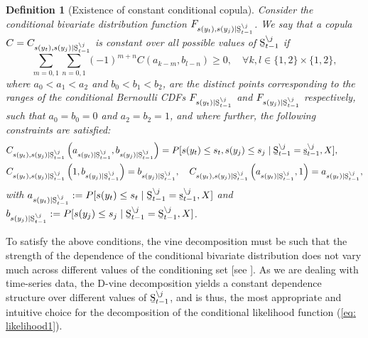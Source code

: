\documentclass[harvard,11pt]{article}
\newtheorem{definition}{Definition}
\begin{document}
\begin{definition}[Existence of constant conditional copula] Consider the conditional bivariate distribution function $F_{s(y_t),s(y_j)\mid \text{\b{S}}_{t-1}^{\backslash j}}$. We say that a copula $C=C_{s(y_t),s(y_j)\mid\text{\b{S}}_{t-1}^{\backslash j}}$ is constant over all possible values of $\text{\b{S}}_{t-1}^{\backslash j}$ if
\[
\sum\limits_{m=0,1}\sum\limits_{n=0,1}(-1)^{m+n}C(a_{k-m},b_{l-n})\geq 0,\quad \forall k,l\in\{1,2\}\times\{1,2\},
\] 
where $a_0<a_1<a_2$ and $b_0<b_1<b_2$, are the distinct points corresponding to the ranges of the conditional Bernoulli CDFs $F_{s(y_t)\mid \text{\b{S}}_{t-1}^{\backslash j}}$ and $F_{s(y_j)\mid \text{\b{S}}_{t-1}^{\backslash j}}$ respectively, such that $a_0=b_0=0$ and $a_{2}=b_{2}=1$, and where further, the following constraints are satisfied:
\begingroup
\allowdisplaybreaks
\begin{align*}
&C_{s(y_t),s(y_j)\mid \text{\b{S}}_{t-1}^{\backslash j}}\left(a_{s(y_t)\mid\text{\b{S}}_{t-1}^{\backslash j}},b_{s(y_j)\mid\text{\b{S}}_{t-1}^{\backslash j}}\right)=P[s(y_t)\leq s_t,s(y_j)\leq s_j\mid \text{\b{S}}_{t-1}^{\backslash j}=\text{\b{s}}_{t-1}^{\backslash j},X],\\
&C_{s(y_t),s(y_j)\mid  \text{\b{S}}_{t-1}^{\backslash j}}\left(1,b_{s(y_j)\mid\text{\b{S}}_{t-1}^{\backslash j}}\right)=b_{s(y_j)\mid\text{\b{S}}_{t-1}^{\backslash j}},\quad C_{s(y_t),s(y_j)\mid  \text{\b{S}}_{t-1}^{\backslash j}}\left(a_{s(y_t)\mid\text{\b{S}}_{t-1}^{\backslash j}},1\right)=a_{s(y_t)\mid\text{\b{S}}_{t-1}^{\backslash j}},
\end{align*}
\endgroup
with $a_{s(y_t)\mid\text{\b{S}}_{t-1}^{\backslash j}}:=P[s(y_t)\leq s_t\mid \text{\b{S}}_{t-1}^{\backslash j}=\text{\b{s}}_{t-1}^{\backslash j},X]$ and $b_{s(y_j)\mid\text{\b{S}}_{t-1}^{\backslash j}}:=P[s(y_j)\leq s_j\mid \text{\b{S}}_{t-1}^{\backslash j}=\text{\b{S}}_{t-1}^{\backslash j},X]$.
\end{definition}

To satisfy the above conditions, the vine decomposition must be such that the strength of the dependence of the conditional bivariate distribution does not vary much across different values of the conditioning set [see \citet{panagiotelis2012pair}]. As we are dealing with time-series data, the D-vine decomposition yields a constant dependence structure over different values of $\text{\b{S}}_{t-1}^{\backslash j}$, and is thus, the most appropriate and intuitive choice for the decomposition of the conditional likelihood function (\ref{eq: likelihood1}). 
\end{document}
